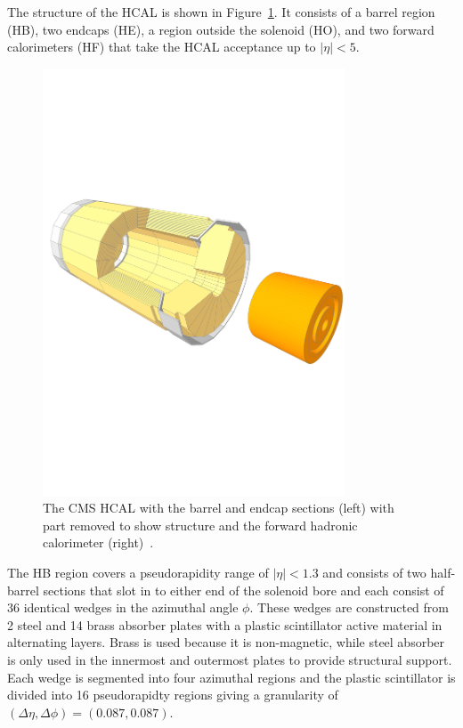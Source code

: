The structure of the HCAL is shown in Figure~\ref{fig:apparatus:hcal}. It consists of a barrel region (HB), two endcaps (HE), a region outside the solenoid (HO), and two forward calorimeters (HF) that take the HCAL acceptance up to $|\eta|<5$. 
\begin{figure}[h!]
    \centering
    \includegraphics[width=0.8\textwidth]{figures/apparatus/HCAL_HF.pdf}
    \caption{The CMS HCAL with the barrel and endcap sections (left) with part removed to show structure and the forward hadronic calorimeter (right)~\cite{SketchupCMS}.}
    \label{fig:apparatus:hcal}
\end{figure}
The HB region covers a pseudorapidity range of $|\eta|<1.3$ and consists of two half-barrel sections that slot in to either end of the solenoid bore and each consist of 36 identical wedges in the azimuthal angle $\phi$. These wedges are constructed from 2 steel and 14 brass absorber plates with a plastic scintillator active material in alternating layers. Brass is used because it is non-magnetic, while steel absorber is only used in the innermost and outermost plates to provide structural support. Each wedge is segmented into four azimuthal regions and the plastic scintillator is divided into 16 pseudorapidty regions giving a granularity of $(\Delta\eta,\Delta\phi) = (0.087,0.087)$.
